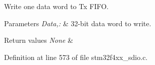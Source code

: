 Write one data word to Tx F\-I\-F\-O. 


\begin{DoxyParams}{Parameters}
{\em Data,\-:} & 32-\/bit data word to write. \\
\hline
\end{DoxyParams}

\begin{DoxyRetVals}{Return values}
{\em None} & \\
\hline
\end{DoxyRetVals}


Definition at line 573 of file stm32f4xx\-\_\-sdio.\-c.


